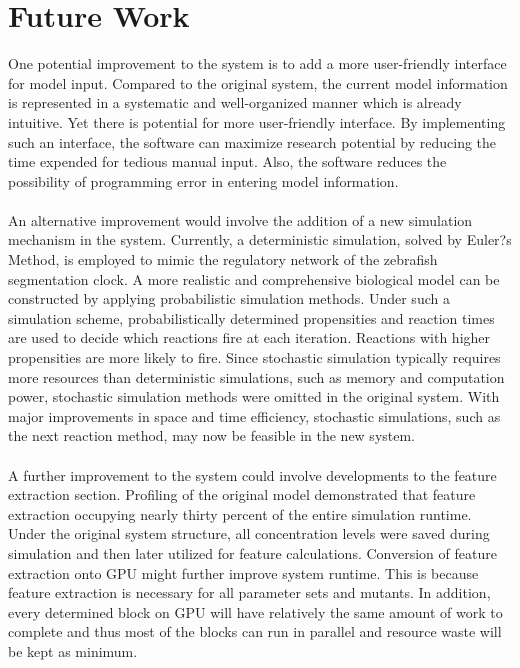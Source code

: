 \documentclass[../thesis.tex]{subfiles}
\begin{document}
\section{Future Work}
One potential improvement to the system is to add a more user-friendly interface for model input. Compared to the original system, the current model information is represented in a systematic and well-organized manner which is already intuitive. Yet there is potential for more user-friendly interface. By implementing such an interface, the software can maximize research potential by reducing the time expended for tedious manual input. Also, the software reduces the possibility of programming error in entering model information. \\
\\
An alternative improvement would involve the addition of a new simulation mechanism in the system. Currently, a deterministic simulation, solved by Euler?s Method, is employed to mimic the regulatory network of the zebrafish segmentation clock. A more realistic and comprehensive biological model can be constructed by applying probabilistic simulation methods. Under such a simulation scheme, probabilistically determined propensities and reaction times are used to decide which reactions fire at each iteration. Reactions with higher propensities are more likely to fire. Since stochastic simulation typically requires more resources than deterministic simulations, such as memory and computation power, stochastic simulation methods were omitted in the original system. With major improvements in space and time efficiency, stochastic simulations, such as the next reaction method, may now be feasible in the new system.\\
\\
A further improvement to the system could involve developments to the feature extraction section. Profiling of the original model demonstrated that feature extraction occupying nearly thirty percent of the entire simulation runtime. Under the original system structure, all concentration levels were saved during simulation and then later utilized for feature calculations. Conversion of feature extraction onto GPU might further improve system runtime. This is because feature extraction is necessary for all parameter sets and mutants. In addition, every determined block on GPU will have relatively the same amount of work to complete and thus most of the blocks can run in parallel and resource waste will be kept as minimum.
\end{document}
